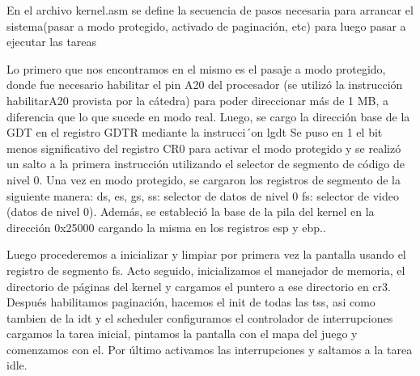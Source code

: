 En el archivo kernel.asm se define la secuencia de pasos necesaria para arrancar el sistema(pasar a modo protegido, activado de paginación, etc) para luego pasar a ejecutar las tareas
 
Lo primero que nos encontramos en el mismo es el pasaje a modo protegido, donde fue necesario habilitar el pin A20 del procesador (se utilizó la
instrucción habilitarA20 provista por la cátedra) para poder direccionar más de 1 MB, a diferencia
que lo que sucede en modo real. Luego, se cargo la dirección base de la GDT en el registro GDTR mediante la instrucci´on lgdt
Se puso en 1 el bit menos significativo del registro CR0 para activar el modo protegido y se realizó un salto a la primera instrucción utilizando el selector de segmento de
código de nivel 0.
Una vez en modo protegido, se cargaron los registros de segmento de la siguiente manera:
ds, es, gs, ss: selector de datos de nivel 0
fs: selector de video (datos de nivel 0).
Además, se estableció la base de la pila del kernel en la dirección 0x25000 cargando la misma en los registros esp y ebp..
 
Luego procederemos a inicializar y limpiar por primera vez la pantalla usando el registro de segmento fs.
Acto seguido, inicializamos el manejador de memoria, el directorio de páginas del kernel y cargamos el puntero a ese directorio en cr3.
Después habilitamos paginación, hacemos el init de todas las tss, asi como tambien de la idt y el scheduler
configuramos el controlador de interrupciones cargamos la tarea inicial, pintamos la pantalla con el mapa del juego y comenzamos con el.
Por último activamos las interrupciones y saltamos a la tarea idle.
